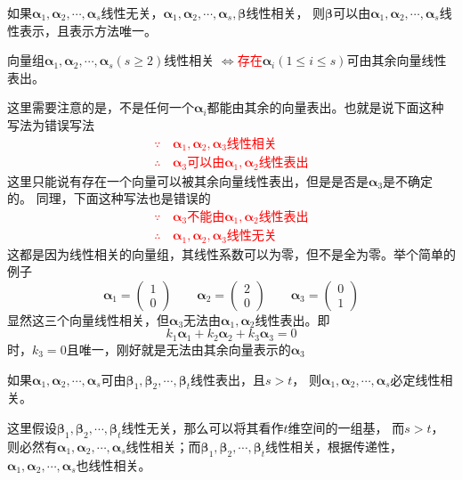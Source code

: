 \begin{theorem}
    如果$\bm{\alpha}_1,\bm{\alpha}_2,\cdots,\bm{\alpha}_s$线性无关，$\bm{\alpha}_1,\bm{\alpha}_2,\cdots,\bm{\alpha}_s,\bm{\beta}$线性相关，
    则$\bm{\beta}$可以由$\bm{\alpha}_1,\bm{\alpha}_2,\cdots,\bm{\alpha}_s$线性表示，且表示方法唯一。
\end{theorem}
\begin{theorem}
    向量组$\bm{\alpha}_1,\bm{\alpha}_2,\cdots,\bm{\alpha}_s(s\geq 2)$线性相关
    $\iff$\textcolor{red}{存在}$\bm{\alpha}_i(1\leq i \leq s)$可由其余向量线性表出。
\end{theorem}
这里需要注意的是，不是任何一个$\bm{\alpha}_i$都能由其余的向量表出。也就是说下面这种写法为错误写法
\textcolor{red}{
    \begin{align*}
        \because   \, & \bm{\alpha}_1,\bm{\alpha}_2,\bm{\alpha}_3\text{线性相关}              \\
        \therefore \, & \bm{\alpha}_3 \text{可以由}\bm{\alpha}_1,\bm{\alpha}_2\text{线性表出}
    \end{align*}
}
这里只能说有存在一个向量可以被其余向量线性表出，但是是否是$\bm{\alpha}_3$是不确定的。
同理，下面这种写法也是错误的
\textcolor{red}{
    \begin{align*}
        \because   \, & \bm{\alpha}_3 \text{不能由}\bm{\alpha}_1,\bm{\alpha}_2 \text{线性表出} \\
        \therefore \, & \bm{\alpha}_1,\bm{\alpha}_2,\bm{\alpha}_3 \text{线性无关}
    \end{align*}
}
这都是因为线性相关的向量组，其线性系数可以为零，但不是全为零。举个简单的例子
\[
    \bm{\alpha}_1 =
    \begin{pmatrix}
        1 \\0
    \end{pmatrix}
    \qquad
    \bm{\alpha}_2 =
    \begin{pmatrix}
        2 \\0
    \end{pmatrix}
    \qquad
    \bm{\alpha}_3 =
    \begin{pmatrix}
        0 \\1
    \end{pmatrix}
\]
显然这三个向量线性相关，但$\bm{\alpha}_3$无法由$\bm{\alpha}_1,\bm{\alpha}_2$线性表出。即
\[ k_1\bm{\alpha}_1 + k_2\bm{\alpha}_2 + k_3\bm{\alpha}_3 = 0 \]
时，$k_3=0$且唯一，刚好就是无法由其余向量表示的$\bm{\alpha}_3$

\begin{theorem}
    如果$\bm{\alpha}_1,\bm{\alpha}_2,\cdots,\bm{\alpha}_s$可由$\bm{\beta}_1,\bm{\beta}_2,\cdots,\bm{\beta}_t$线性表出，且$s>t$，
    则$\bm{\alpha}_1,\bm{\alpha}_2,\cdots,\bm{\alpha}_s$必定线性相关。
\end{theorem}
这里假设$\bm{\beta}_1,\bm{\beta}_2,\cdots,\bm{\beta}_t$线性无关，那么可以将其看作$t$维空间的一组基，
而$s>t$，则必然有$\bm{\alpha}_1,\bm{\alpha}_2,\cdots,\bm{\alpha}_s$线性相关；而$\bm{\beta}_1,\bm{\beta}_2,\cdots,\bm{\beta}_t$线性相关，根据传递性，
$\bm{\alpha}_1,\bm{\alpha}_2,\cdots,\bm{\alpha}_s$也线性相关。

